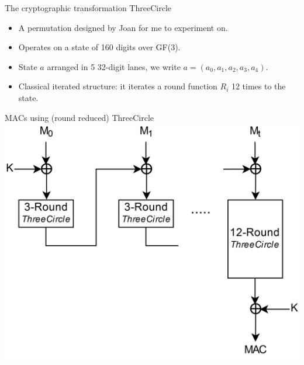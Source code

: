 \documentclass{beamer}
\begin{document}
\begin{frame}{The cryptographic transformation ThreeCircle}
\begin{itemize}
    \item A permutation designed by Joan for me to experiment on.
    \item Operates on a state of 160 digits over GF(3).
    \item State $a$ arranged in 5 32-digit lanes, we write $a = (a_0, a_1, a_2, a_3, a_4)$.
    \item Classical iterated structure: it iterates a round function $R_i$ 12 times to the state.
\end{itemize}
\end{frame}

\begin{frame}{MACs using (round reduced) ThreeCircle}
\centering\includegraphics[scale=0.12]{HMAC_HighRes_ThreeCircle.png}
\end{frame}
\end{document}
